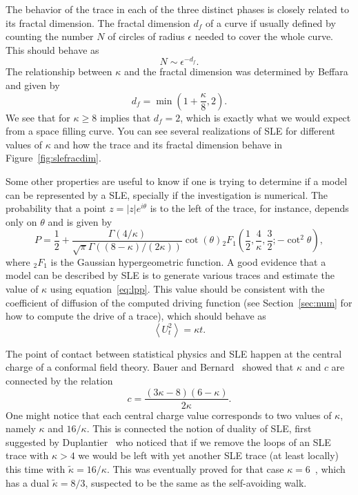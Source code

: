 The behavior of the trace in each of the three distinct phases is closely
related to its fractal dimension. The fractal dimension $d_f$ of a curve if
usually defined by counting the number $N$ of circles of radius $\epsilon$
needed to cover the whole curve. This should behave as~\cite{Mandelbrot1983}
\begin{equation}
    N\sim \epsilon^{-d_f}.
\end{equation}
The relationship between $\kappa$ and the fractal dimension was determined by
Beffara~\cite{Beffara2008} and given by
\begin{equation}
    d_f=\min\left(1+\frac{\kappa}{8},2\right).
\end{equation}
We see that for $\kappa\geq 8$ implies that $d_f=2$, which is exactly what we
would expect from a space filling curve. You can see several realizations of
SLE for different values of $\kappa$ and how the trace and its fractal
dimension behave in Figure~\ref{fig:slefracdim}.

Some other properties are useful to know if one is trying to determine if a
model can be represented by a SLE, specially if the investigation is numerical.
The probability that a point $z=|z|e^{i\theta}$ is to the left of the trace,
for instance, depends only on $\theta$ and is given by
\begin{equation}
    \label{eq:lpp}
    P=\frac{1}{2}+
    \frac{\Gamma\left(4/\kappa\right)}
         {\sqrt{\pi}
          \Gamma\left(\left(8-\kappa\right)/\left(2\kappa\right)\right)}
    \cot\left(\theta\right)
    {}_{2}F_{1}\left(\frac{1}{2},\frac{4}{\kappa},\frac{3}{2};
        -\cot^{2}\theta\right),
\end{equation}
where ${}_2F_1$ is the Gaussian hypergeometric function. A good evidence that a
model can be described by SLE is to generate various traces and estimate the
value of $\kappa$ using equation~\ref{eq:lpp}. This value should be consistent
with the coefficient of diffusion of the computed driving function (see
Section~\ref{sec:num} for how to compute the drive of a trace), which should
behave as
\begin{equation}
    \left\langle U_{t}^{2}\right\rangle =\kappa t.
\end{equation}

The point of contact between statistical physics and SLE happen at the
central charge of a conformal field theory. Bauer and Bernard~\cite{Bauer2002}
showed that $\kappa$ and $c$ are connected by the relation
\begin{equation}
    c=\frac{\left(3\kappa-8\right)\left(6-\kappa\right)}{2\kappa}.
\end{equation}
One might notice that each central charge value corresponds to two values of
$\kappa$, namely $\kappa$ and $16/\kappa$. This is connected the notion of
duality of SLE, first suggested by Duplantier~\cite{Duplantier2000} who noticed
that if we remove the loops of an SLE trace with $\kappa>4$ we would be left
with yet another SLE trace (at least locally) this time with
$\tilde{\kappa}=16/\kappa$. This was eventually proved for that case
$\kappa=6$~\cite{Beffara2004}, which has a dual $\tilde{\kappa}=8/3$, suspected
to be the same as the self-avoiding walk.

